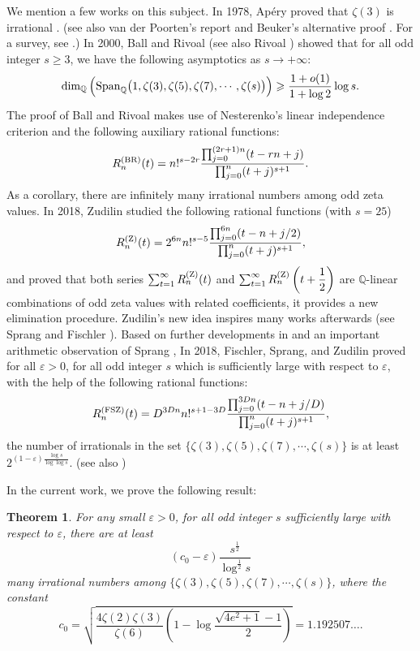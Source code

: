 \documentclass[11pt]{amsart}
\newtheorem{theorem}{Theorem}[section]
\numberwithin{equation}{section}
\begin{document}
We mention a few works on this subject. In 1978, Ap\'ery proved that $\zeta(3)$ is irrational \cite{Ap79}. (see also van der Poorten's report \cite{Po79} and Beuker's alternative proof \cite{Be79}. For a survey, see \cite{Fi04}.) In 2000, Ball and Rivoal \cite{BR01} (see also Rivoal \cite{Ri00}) showed that for all odd integer $s \geqslant 3$, we have the following asymptotics as $s \rightarrow +\infty$:
\[\dim_{\mathbb{Q}}\Big({\rm{Span}}_{\mathbb{Q}}\big(1,\zeta(3),\zeta(5),\zeta(7),\cdots,\zeta(s)\big) \Big) \geqslant \frac{1 + o(1)}{1 + \log 2} \log s.\]
The proof of Ball and Rivoal makes use of Nesterenko's linear independence criterion \cite{Ne85} and the following auxiliary rational functions:
\[R_{n}^{\rm{(BR)}}(t) = n!^{s-2r} \frac{\prod_{j=0}^{(2r+1)n}(t-rn+j)}{\prod_{j=0}^{n}(t+j)^{s+1}}.\]
As a corollary, there are infinitely many irrational numbers among odd zeta values. In 2018, Zudilin \cite{Zu18} studied the following rational functions (with $s = 25$)
\[R_n^{\rm{(Z)}}(t) = 2^{6n} n!^{s-5} \frac{\prod_{j=0}^{6n} (t-n + j/2)}{ \prod_{j=0}^{n} (t+j)^{s+1}},\]
and proved that both series $\sum_{t=1}^{\infty} R_n^{\rm{(Z)}}(t)$ and $\sum_{t=1}^{\infty} R_n^{\rm{(Z)}}\left(t+\dfrac{1}{2}\right)$ are $\mathbb{Q}$-linear combinations of odd zeta values with related coefficients, it provides a new elimination procedure. Zudilin's new idea inspires many works afterwards (see Sprang \cite{Sp18} and Fischler \cite{Fi19}). Based on further developments in \cite{Zu18} and an important arithmetic observation of Sprang \cite[Lemma 1.4]{Sp18}, In 2018, Fischler, Sprang, and Zudilin \cite{FSZ2019} proved for all $\varepsilon >0$, for all odd integer $s$ which is sufficiently large with respect to $\varepsilon$, with the help of the following rational functions:
\[R_{n}^{\rm(FSZ)}(t) = D^{3Dn} n!^{s+1-3D} \frac{ \prod_{j=0}^{3Dn}(t-n+j/D)}{ \prod_{j=0}^{n}(t+j)^{s+1}},\]
the number of irrationals in the set $\big\{\zeta(3),\zeta(5),\zeta(7),\cdots,\zeta(s)\big\}$ is at least $2^{(1-\varepsilon)\frac{\log s}{\log \log s}}$. (see also \cite{FSZ18})

\smallskip

In the current work, we prove the following result:

\smallskip

\begin{theorem}\label{MainThm}
For any small $\varepsilon > 0$, for all odd integer $s$ sufficiently large with respect to $\varepsilon$, there are at least
\[ \left(c_0 - \varepsilon\right) \frac{s^{\frac{1}{2}}}{\log^{\frac{1}{2}} s} \]
many irrational numbers among $\big\{\zeta(3),\zeta(5),\zeta(7),\cdots,\zeta(s)\big\}$, where the constant
\[ c_0 = \sqrt{\frac{4\zeta(2)\zeta(3)}{\zeta(6)} \left( 1 - \log \frac{\sqrt{4e^2+1}-1}{2} \right) }  = 1.192507\ldots. \]
\end{theorem}
\end{document}
